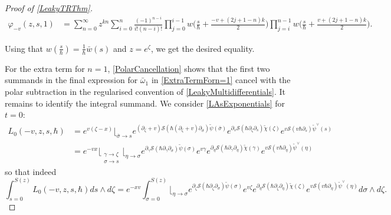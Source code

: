 \documentclass[10pt,a4paper,oneside,no-math,reqno]{amsart}%
\theoremstyle{plain}
\theoremstyle{definition}
\theoremstyle{remark}
\numberwithin{equation}{section}
\renewcommand{\phi}{\varphi}
\newcommand{\mc}[1]{\mathcal{#1}}
\newcommand{\1}{\mathds{1}}
\newcommand{\<}{\langle}
\renewcommand{\>}{\rangle}
\newcommand{\del}{\partial}
\begin{document}
\begin{proof}[Proof of \cref{LeakyTRThm}]
	\begin{equation*}
		\begin{split}
			\phi_{-v} ( z, s, 1) 
			&=
			\sum_{n=0}^\infty z^{kn} \sum_{i=0}^n \frac{(-1)^{n-i}}{i!(n-i)!} \prod_{j=0}^{i-1} w \big( \frac{s}{\hbar} + \frac{-v + (2j+1-n)k}{2} \big) \prod_{j=i}^{n-1} w \big( \frac{s}{\hbar} + \frac{v + (2j+1-n)k}{2} \big) .
		\end{split}
	\end{equation*}

	Using that $ w(\frac{s}{\hbar}) = \frac{1}{\hbar}\bar{w}(s)$ and $ z = e^\zeta $, we get the desired equality.\par
	For the extra term for $ n =1$, \cref{PolarCancellation} shows that the first two summands in the final expression for $\bar{\omega}_1$ in \cref{ExtraTermForn=1} cancel with the polar subtraction in the regularised convention of \cref{LeakyMultidifferentials}. It remains to identify the integral summand. We consider \cref{LAsExponentials} for $ t = 0$:
	\begin{equation}
		\begin{split}
			L_0(-v, z, s, \hbar)
			&=
			e^{v(\zeta - x)} \Big\lfloor_{\bar{\sigma} \to s}
			e^{ (\del_\zeta +v) \mc{S}( \hbar (\del_\zeta + v) \del_{\bar{\sigma}} )\tilde{\psi} (\bar{\sigma}) }
			e^{ \del_s \mc{S}( \hbar \del_\zeta \del_s ) \tilde{\chi} (\zeta) }
			e^{v \mc{S}(v \hbar \del_s) \tilde{\psi}^\vee (s)} 
			\\
			&=
			e^{-v x}
			\Big\lfloor_{\substack{\gamma \to \zeta \\ \sigma \to s}} \Big\lfloor_{\eta \to \sigma}
			e^{ \del_\gamma \mc{S}( \hbar \del_\gamma \del_\sigma )\tilde{\psi} (\sigma ) }
			e^{v \gamma} e^{ \del_\eta \mc{S}( \hbar \del_\gamma \del_\eta)\tilde{\chi} (\gamma) }
			e^{v \mc{S}(v \hbar \del_\eta) \tilde{\psi}^\vee (\eta)}
		\end{split}
	\end{equation}
	so that indeed
	\begin{equation}
		\int_{s = 0}^{S(z)} \!\! L_0 (-v, z, s, \hbar ) ds \wedge d\zeta
		=
		e^{-xv} \int_{\sigma=0}^{S(z)} \Big\lfloor_{\eta \to \sigma} \!\!
			e^{ \del_\zeta \mc{S}( \hbar \del_\zeta \del_\sigma )\tilde{\psi} (\sigma ) }
			e^{v \zeta} e^{ \del_\eta \mc{S}( \hbar \del_\zeta \del_\eta)\tilde{\chi} (\zeta) }
			e^{v \mc{S}(v \hbar \del_\eta) \tilde{\psi}^\vee (\eta)} d\sigma \wedge d\zeta .
	\end{equation}
\end{proof}

\printbibliography
\end{document}
